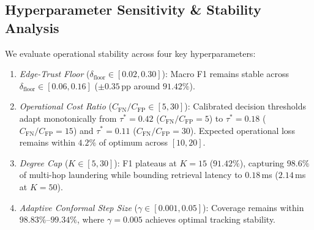 \subsection{Hyperparameter Sensitivity \& Stability Analysis}
\label{sec:sensitivity_analysis}
We evaluate operational stability across four key hyperparameters:
\begin{enumerate}
    \item \textit{Edge-Trust Floor} ($\delta_{\text{floor}} \in [0.02, 0.30]$): Macro F1 remains stable across $\delta_{\text{floor}} \in [0.06, 0.16]$ ($\pm 0.35$\,pp around $91.42\%$).
    \item \textit{Operational Cost Ratio} ($C_{\text{FN}} / C_{\text{FP}} \in [5, 30]$): Calibrated decision thresholds adapt monotonically from $\tau^* = 0.42$ ($C_{\text{FN}}/C_{\text{FP}}=5$) to $\tau^* = 0.18$ ($C_{\text{FN}}/C_{\text{FP}}=15$) and $\tau^* = 0.11$ ($C_{\text{FN}}/C_{\text{FP}}=30$). Expected operational loss remains within $4.2\%$ of optimum across $[10, 20]$.
    \item \textit{Degree Cap} ($K \in [5, 30]$): F1 plateaus at $K=15$ ($91.42\%$), capturing $98.6\%$ of multi-hop laundering while bounding retrieval latency to $0.18$\,ms ($2.14$\,ms at $K=50$).
    \item \textit{Adaptive Conformal Step Size} ($\gamma \in [0.001, 0.05]$): Coverage remains within $98.83\%$--$99.34\%$, where $\gamma=0.005$ achieves optimal tracking stability.
\end{enumerate}
